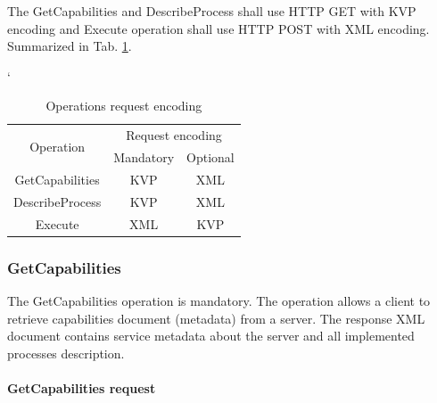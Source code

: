 \documentclass[12pt,a4paper]{article}
\begin{document}
The GetCapabilities and DescribeProcess shall use HTTP GET with KVP encoding and Execute operation shall use HTTP
POST with XML encoding. Summarized in Tab. \ref{tab:WPS_encoding}.
\begin{table}[h!]
\catcode`
\centering
\begin{tabular}{|c|c|c|}
\hline
\multirow{2}{*}{Operation} & \multicolumn{2}{c|}{Request encoding} \\ \cline{2-3} 
                           & Mandatory          & Optional         \\ \hhline{|=|=|=|}
GetCapabilities            & KVP                & XML              \\ \hline
DescribeProcess            & KVP                & XML              \\ \hline
Execute                    & XML                & KVP              \\ \hline
\end{tabular}
\caption{Operations request encoding}
\label{tab:WPS_encoding}
\end{table}

\subsubsection{GetCapabilities}
The GetCapabilities operation is mandatory. The operation allows a client to retrieve capabilities document (metadata)
from a server. The response XML document contains service metadata about the server and all implemented processes description.

\paragraph{GetCapabilities request}
\end{document}
